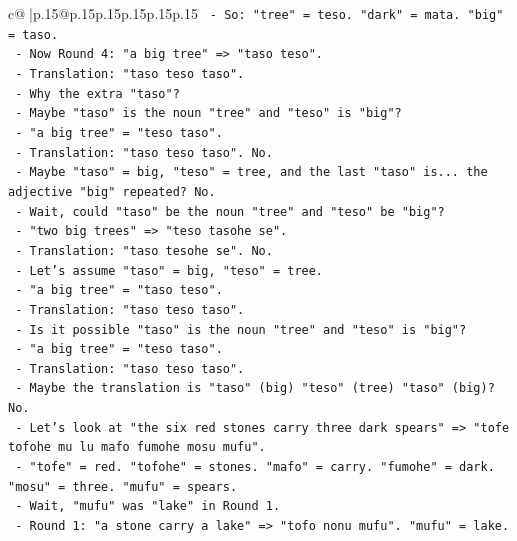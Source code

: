 \documentclass{article}
\begin{document}
{\begin{supertabular}{c@{$\;$}|p{.15\linewidth}@{}p{.15\linewidth}p{.15\linewidth}p{.15\linewidth}p{.15\linewidth}p{.15\linewidth}}
{{{\texttt{              {-} So: "tree" = teso. "dark" = mata. "big" = taso.} \\
\texttt{              {-} Now Round 4: "a big tree" => "taso teso".} \\
\texttt{              {-} Translation: "taso teso taso".} \\
\texttt{              {-} Why the extra "taso"?} \\
\texttt{              {-} Maybe "taso" is the noun "tree" and "teso" is "big"?} \\
\texttt{                {-} "a big tree" = "teso taso".} \\
\texttt{                {-} Translation: "taso teso taso". No.} \\
\texttt{              {-} Maybe "taso" = big, "teso" = tree, and the last "taso" is... the adjective "big" repeated? No.} \\
\texttt{              {-} Wait, could "taso" be the noun "tree" and "teso" be "big"?} \\
\texttt{                {-} "two big trees" => "teso tasohe se".} \\
\texttt{                {-} Translation: "taso tesohe se". No.} \\
\texttt{              {-} Let's assume "taso" = big, "teso" = tree.} \\
\texttt{              {-} "a big tree" = "taso teso".} \\
\texttt{              {-} Translation: "taso teso taso".} \\
\texttt{              {-} Is it possible "taso" is the noun "tree" and "teso" is "big"?} \\
\texttt{                {-} "a big tree" = "teso taso".} \\
\texttt{                {-} Translation: "taso teso taso".} \\
\texttt{              {-} Maybe the translation is "taso" (big) "teso" (tree) "taso" (big)? No.} \\
\texttt{              {-} Let's look at "the six red stones carry three dark spears" => "tofe tofohe mu lu mafo fumohe mosu mufu".} \\
\texttt{                {-} "tofe" = red. "tofohe" = stones. "mafo" = carry. "fumohe" = dark. "mosu" = three. "mufu" = spears.} \\
\texttt{                {-} Wait, "mufu" was "lake" in Round 1.} \\
\texttt{                {-} Round 1: "a stone carry a lake" => "tofo nonu mufu". "mufu" = lake.} \\
}}}
\end{supertabular}}
\end{document}
